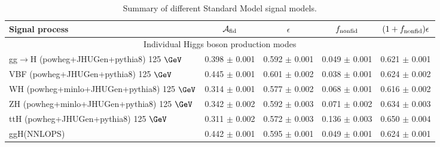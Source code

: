 \documentclass{article}
\begin{document}
\begin{table}[!h!tb]
\begin{center}
\small
\caption{
Summary of different Standard Model signal models.
\label{tab:summarySM}
}
\begin{tabular}{|l|c|c|c|c|} \hline \hline 
\textbf{Signal process} & $\mathcal{A}_{\rm fid}$ & $\epsilon$ & $f_{\rm nonfid}$  & $(1+f_{\rm nonfid})\epsilon$ \\ \hline \hline 
\multicolumn{5}{|c|}{Individual Higgs boson production modes} \\ \hline 
gg$\rightarrow$H ({\sc powheg+JHUGen+pythia8}) 125 $\GeV$ & 0.398 $\pm$ 0.001 & 0.592 $\pm$ 0.001 & 0.049 $\pm$ 0.001 & 0.621 $\pm$ 0.001 \\ 
 VBF ({\sc powheg+JHUGen+pythia8}) 125 $\GeV$ & 0.445 $\pm$ 0.001 & 0.601 $\pm$ 0.002 & 0.038 $\pm$ 0.001 & 0.624 $\pm$ 0.002 \\ 
 WH ({\sc powheg+minlo+JHUGen+pythia8}) 125 $\GeV$ & 0.314 $\pm$ 0.001 & 0.577 $\pm$ 0.002 & 0.068 $\pm$ 0.001 & 0.616 $\pm$ 0.002 \\ 
 ZH ({\sc powheg+minlo+JHUGen+pythia8}) 125 $\GeV$ & 0.342 $\pm$ 0.002 & 0.592 $\pm$ 0.003 & 0.071 $\pm$ 0.002 & 0.634 $\pm$ 0.003 \\ 
 ttH ({\sc powheg+JHUGen+pythia8}) 125 $\GeV$ & 0.311 $\pm$ 0.002 & 0.572 $\pm$ 0.003 & 0.136 $\pm$ 0.003 & 0.650 $\pm$ 0.004 \\ 
 ggH(NNLOPS) & 0.442 $\pm$ 0.001 & 0.595 $\pm$ 0.001 & 0.049 $\pm$ 0.001 & 0.624 $\pm$ 0.001 \\ 
 
\hline \hline
\end{tabular}
\normalsize
\end{center}
\end{table}
 
 
 
\end{document}
